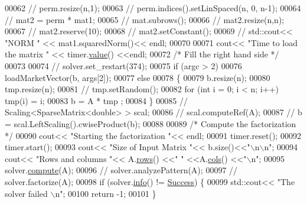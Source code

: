 \begin{DoxyCode}
00062 \textcolor{comment}{//   perm.resize(n,1);}
00063 \textcolor{comment}{//   perm.indices().setLinSpaced(n, 0, n-1);}
00064 \textcolor{comment}{//   mat2 = perm * mat1;}
00065 \textcolor{comment}{//   mat.subrows();}
00066 \textcolor{comment}{//   mat2.resize(n,n); }
00067 \textcolor{comment}{//   mat2.reserve(10);}
00068 \textcolor{comment}{//   mat2.setConstant();}
00069 \textcolor{comment}{//   std::cout<< "NORM " << mat1.squaredNorm()<< endl;  }
00070 
00071   cout<< \textcolor{stringliteral}{"Time to load the matrix "} << timer.\hyperlink{class_eigen_1_1_bench_timer_a26760f963ed8b64c126159bfea57735e}{value}() <<endl;
00072   \textcolor{comment}{/* Fill the right hand side */}
00073 
00074 \textcolor{comment}{//   solver.set\_restart(374);}
00075   \textcolor{keywordflow}{if} (argc > 2)
00076     loadMarketVector(b, args[2]);
00077   \textcolor{keywordflow}{else} 
00078   \{
00079     b.resize(n);
00080     tmp.resize(n);
00081 \textcolor{comment}{//       tmp.setRandom();}
00082     \textcolor{keywordflow}{for} (\textcolor{keywordtype}{int} i = 0; i < n; i++) tmp(i) = i; 
00083     b = A * tmp ;
00084   \}
00085 \textcolor{comment}{//   Scaling<SparseMatrix<double> > scal; }
00086 \textcolor{comment}{//   scal.computeRef(A);}
00087 \textcolor{comment}{//   b = scal.LeftScaling().cwiseProduct(b);}
00088 
00089   \textcolor{comment}{/* Compute the factorization */}
00090   cout<< \textcolor{stringliteral}{"Starting the factorization "}<< endl; 
00091   timer.reset();
00092   timer.start(); 
00093   cout<< \textcolor{stringliteral}{"Size of Input Matrix "}<< b.size()<<\textcolor{stringliteral}{"\(\backslash\)n\(\backslash\)n"};
00094   cout<< \textcolor{stringliteral}{"Rows and columns "}<< A.\hyperlink{group___sparse_core___module_a62e61bb861eee306d5b069ce652b5aa5}{rows}() <<\textcolor{stringliteral}{" "} <<A.\hyperlink{group___sparse_core___module_aa391750e3c530227e4a5c3c52e959975}{cols}() <<\textcolor{stringliteral}{"\(\backslash\)n"};
00095   solver.\hyperlink{group___iterative_linear_solvers___module_a7dfa55c55e82d697bde227696a630914}{compute}(A);
00096 \textcolor{comment}{//   solver.analyzePattern(A);}
00097 \textcolor{comment}{//   solver.factorize(A);}
00098   \textcolor{keywordflow}{if} (solver.\hyperlink{group___iterative_linear_solvers___module_a0d6b459433a316b4f12d48e5c80d61fe}{info}() != \hyperlink{group__enums_gga85fad7b87587764e5cf6b513a9e0ee5ea52581b035f4b59c203b8ff999ef5fcea}{Success}) \{
00099     std::cout<< \textcolor{stringliteral}{"The solver failed \(\backslash\)n"};
00100     \textcolor{keywordflow}{return} -1; 
00101   \}

\end{DoxyCode}

